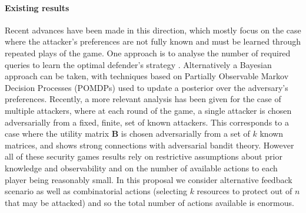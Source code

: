 \paragraph{Existing results}
Recent advances have been made in this direction, which mostly focus on the case where the attacker's preferences are not fully known and must be learned through repeated plays of the game. One approach is to analyse the number of required queries to learn the optimal defender's strategy \cite{blum2014learning, letchford2009learning}. 
Alternatively a Bayesian approach can be taken, with techniques based on Partially Observable Markov Decision Processes (POMDPs) used to update a posterior over the adversary's preferences\cite{Marecki12PR, qian2014online}. 
Recently, a more relevant analysis has been given\cite{Balcan15CR} for the case of multiple attackers, where at each round of the game, a single attacker is chosen adversarially from a fixed, finite, set of known attackers. This corresponds to a case where the utility matrix $\boldsymbol B$ is chosen adversarially from a set of $k$ known matrices, and shows strong connections with adversarial bandit theory.  However all of these security games results rely on restrictive assumptions about prior knowledge and observability and on the number of available actions to each player being reasonably small.  In this proposal we consider alternative feedback scenario as well as  combinatorial actions (selecting $k$ resources to protect out of $n$ that may be attacked) and so the total number of actions available is enormous. 

